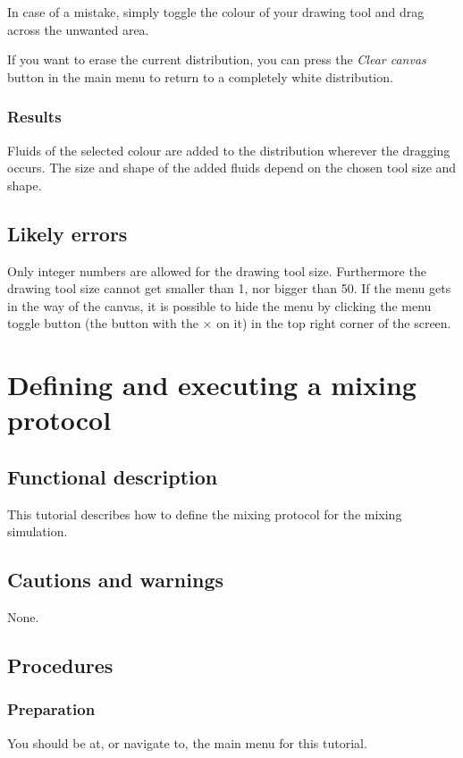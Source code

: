 In case of a mistake, simply toggle the colour of your drawing tool and drag across the unwanted area.

If you want to erase the current distribution, you can press the \emph{Clear canvas} button in the main menu to return to a completely white distribution.

\subsubsection{Results}
Fluids of the selected colour are added to the distribution wherever the dragging occurs. The size and shape of the added fluids depend on the chosen tool size and shape.

\subsection{Likely errors}
Only integer numbers are allowed for the drawing tool size. Furthermore the drawing tool size cannot get smaller than 1, nor bigger than 50. If the menu gets in the way of the canvas, it is possible to hide the menu by clicking the menu toggle button (the button with the $\times$ on it) in the top right corner of the screen.


\section{Defining and executing a mixing protocol}
\label{sec:defineMixProt}

\subsection{Functional description}
This tutorial describes how to define the mixing protocol for the mixing simulation.

\subsection{Cautions and warnings}
None.

\subsection{Procedures}
\subsubsection{Preparation}
%
You should be at, or navigate to, the main menu for this tutorial.

